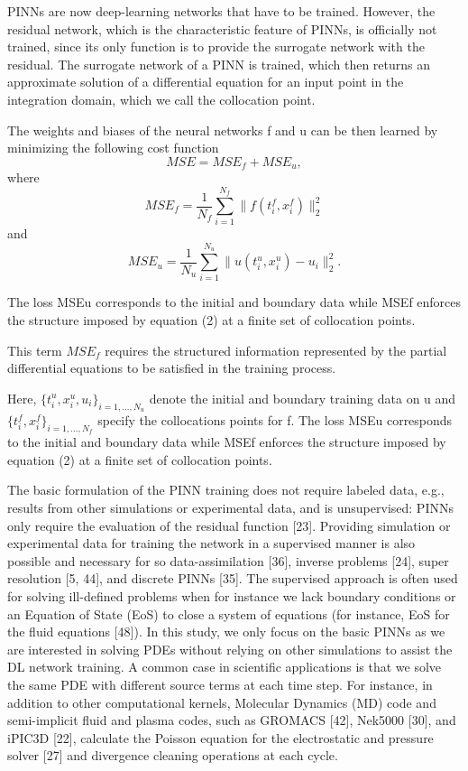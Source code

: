 PINNs are now deep-learning networks that have to be trained. However, the residual network, which is the characteristic feature of PINNs, is officially not trained, since its only function is to provide the surrogate network with the residual. The surrogate network of a PINN is trained, which then returns an approximate solution of a differential equation for an input point in the integration domain, which we call the collocation point.

The weights and biases of the neural networks f and u can be then learned by minimizing the following cost function
\begin{equation*}
    MSE = MSE_f + MSE_u, 
\end{equation*}
where
\begin{equation*}
    MSE_f = \frac{1}{N_f} \sum^{N_f}_{i = 1} \lVert f(t^{f}_i, x^{f}_i) \rVert^{2}_{2}
\end{equation*}
and
\begin{equation*}
    MSE_u = \frac{1}{N_u} \sum^{N_u}_{i = 1} \lVert u(t^{u}_i, x^{u}_i) - u_i \rVert^{2}_{2}.
\end{equation*}




The loss MSEu corresponds to the initial and boundary data while MSEf enforces the structure imposed by equation (2) at a finite set of collocation points.

This term $MSE_f$ requires the structured information represented by the partial differential equations to be satisfied in the training process.

Here, $\{t^{u}_i, x^{u}_i, u_i \}_{i = 1, \ldots, N_u}$ denote the initial and boundary training data on u and  $\{t^{f}_i, x^{f}_i \}_{i = 1, \ldots, N_f}$ specify the collocations points for f. The loss MSEu corresponds to the initial and boundary data while MSEf enforces the structure imposed by equation (2) at a finite set of collocation points. 



The basic formulation of the PINN training does not require labeled data, e.g., results from other simulations or experimental data, and is unsupervised: PINNs only require the evaluation of the residual function [23]. Providing simulation or experimental data for training the network in a supervised manner is also possible and necessary for so data-assimilation [36], inverse problems [24], super resolution [5, 44], and discrete PINNs [35]. The supervised approach is often used for solving ill-defined problems when for instance we lack boundary conditions or an Equation of State (EoS) to close a system of equations (for instance, EoS for the fluid equations [48]). In this study, we only focus on the basic PINNs as we are interested in solving PDEs without relying on other simulations to assist the DL network training. A common case in scientific applications is that we solve the same PDE with different source terms at each time step. For instance, in addition to other computational kernels, Molecular Dynamics (MD) code and semi-implicit fluid and plasma codes, such as GROMACS [42], Nek5000 [30], and iPIC3D [22], calculate the Poisson equation for the electrostatic and pressure solver [27] and divergence cleaning operations at each cycle.

